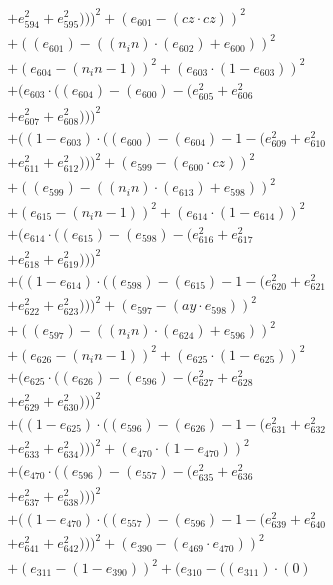 \documentclass[10pt, a4paper]{article}
\begin{document}
\begin{align*}
& + e_{594}^{2} + e_{595}^{2})))^{2} + (e_{601} - (cz  \cdot  cz))^{2} \\
& + ((e_{601}) - ((n_in)  \cdot  (e_{602}) + e_{600}))^{2} \\
& + (e_{604} - (n_in - 1))^{2} + (e_{603}  \cdot  (1 - e_{603}))^{2} \\
& + (e_{603}  \cdot  ((e_{604}) - (e_{600}) - (e_{605}^{2} + e_{606}^{2} \\
& + e_{607}^{2} + e_{608}^{2})))^{2} \\
& + ((1 - e_{603})  \cdot  ((e_{600}) - (e_{604}) - 1 - (e_{609}^{2} + e_{610}^{2} \\
& + e_{611}^{2} + e_{612}^{2})))^{2} + (e_{599} - (e_{600}  \cdot  cz))^{2} \\
& + ((e_{599}) - ((n_in)  \cdot  (e_{613}) + e_{598}))^{2} \\
& + (e_{615} - (n_in - 1))^{2} + (e_{614}  \cdot  (1 - e_{614}))^{2} \\
& + (e_{614}  \cdot  ((e_{615}) - (e_{598}) - (e_{616}^{2} + e_{617}^{2} \\
& + e_{618}^{2} + e_{619}^{2})))^{2} \\
& + ((1 - e_{614})  \cdot  ((e_{598}) - (e_{615}) - 1 - (e_{620}^{2} + e_{621}^{2} \\
& + e_{622}^{2} + e_{623}^{2})))^{2} + (e_{597} - (ay  \cdot  e_{598}))^{2} \\
& + ((e_{597}) - ((n_in)  \cdot  (e_{624}) + e_{596}))^{2} \\
& + (e_{626} - (n_in - 1))^{2} + (e_{625}  \cdot  (1 - e_{625}))^{2} \\
& + (e_{625}  \cdot  ((e_{626}) - (e_{596}) - (e_{627}^{2} + e_{628}^{2} \\
& + e_{629}^{2} + e_{630}^{2})))^{2} \\
& + ((1 - e_{625})  \cdot  ((e_{596}) - (e_{626}) - 1 - (e_{631}^{2} + e_{632}^{2} \\
& + e_{633}^{2} + e_{634}^{2})))^{2} + (e_{470}  \cdot  (1 - e_{470}))^{2} \\
& + (e_{470}  \cdot  ((e_{596}) - (e_{557}) - (e_{635}^{2} + e_{636}^{2} \\
& + e_{637}^{2} + e_{638}^{2})))^{2} \\
& + ((1 - e_{470})  \cdot  ((e_{557}) - (e_{596}) - 1 - (e_{639}^{2} + e_{640}^{2} \\
& + e_{641}^{2} + e_{642}^{2})))^{2} + (e_{390} - (e_{469}  \cdot  e_{470}))^{2} \\
& + (e_{311} - (1 - e_{390}))^{2} + (e_{310} - ((e_{311})  \cdot  (0) \\

\end{align*}
\end{document}
